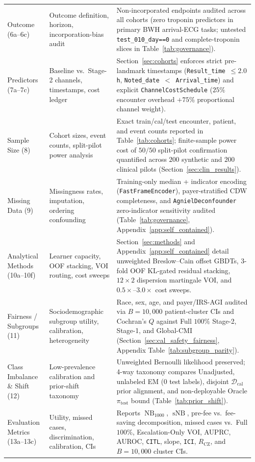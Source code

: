 \begin{table}[h!]
\begin{tabular}{>{\raggedright\arraybackslash}p{}>{\raggedright\arraybackslash}p{}>{\raggedright\arraybackslash}p{}}
Outcome (6a--6c) & Outcome definition, horizon, incorporation-bias audit & Non-incorporated endpoints audited across all cohorts (zero troponin predictors in primary BWH arrival-ECG tasks; untested \texttt{test\_010\_day==0} and complete-troponin slices in Table~\ref{tab:governance}). \\
Predictors (7a--7c) & Baseline vs.\ Stage-2 channels, timestamps, cost ledger & Section~\ref{sec:cohorts} enforces strict pre-landmark timestamps (\texttt{Result\_time $\le 2.0$h}, \texttt{Noted\_date $<$ Arrival\_time}) and explicit \texttt{ChannelCostSchedule} ($25\%$ encounter overhead $+ 75\%$ proportional channel weight). \\
Sample Size (8) & Cohort sizes, event counts, split-pilot power analysis & Exact train/cal/test encounter, patient, and event counts reported in Table~\ref{tab:cohorts}; finite-sample power cost of $50/50$ split-pilot confirmation quantified across $200$ synthetic and $200$ clinical pilots (Section~\ref{sec:clin_results}). \\
Missing Data (9) & Missingness rates, imputation, ordering confounding & Training-only median + indicator encoding (\texttt{FastFrameEncoder}), payer-stratified CDW completeness, and \texttt{AgnielDeconfounder} zero-indicator sensitivity audited (Table~\ref{tab:governance}, Appendix~\ref{app:self_contained}). \\
Analytical Methods (10a--10f) & Learner capacity, OOF stacking, VOI routing, cost sweeps & Section~\ref{sec:methods} and Appendix~\ref{app:self_contained} detail unweighted Breslow--Cain offset GBDTs, $3$-fold OOF KL-gated residual stacking, $12\times 2$ dispersion martingale VOI, and $0.5\times\text{--}3.0\times$ cost sweeps. \\
Fairness / Subgroups (11) & Sociodemographic subgroup utility, calibration, heterogeneity & Race, sex, age, and payer/IRS-AGI audited via $B=10{,}000$ patient-cluster CIs and Cochran's $Q$ against Full $100\%$ Stage-2, Stage-1, and Global-CMI (Section~\ref{sec:cal_safety_fairness}, Appendix Table~\ref{tab:subgroup_parity}). \\
Class Imbalance \& Shift (12) & Low-prevalence calibration and prior-shift taxonomy & Unweighted Bernoulli likelihood preserved; 4-way taxonomy compares Unadjusted, unlabeled \citet{saerens2002adjusting} EM ($0$ test labels), disjoint $\mathcal{D}_{\text{cal}}$ prior alignment, and non-deployable Oracle $\pi_{\text{test}}$ bound (Table~\ref{tab:prior_shift}). \\
Evaluation Metrics (13a--13c) & Utility, missed cases, discrimination, calibration, CIs & Reports $\operatorname{NB}_{1000}$, $\operatorname{sNB}$, pre-fee vs.\ fee-saving decomposition, missed cases vs.\ Full $100\%$, Escalation-Only VOI, AUPRC, AUROC, \texttt{CITL}, slope, \texttt{ICI}, $R_{\text{CZ}}$, and $B=10{,}000$ cluster CIs. \\

\end{tabular}
\end{table}
